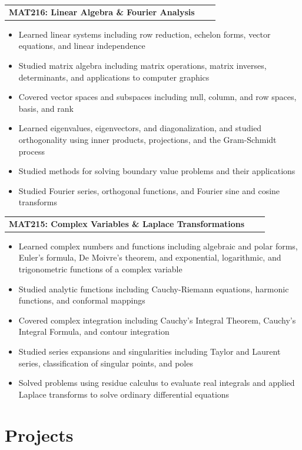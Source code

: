 \documentclass[a4paper,12pt]{article}
\makeatletter
\newenvironment{joblong}[2]
    {
    \begin{tabularx}{\linewidth}{@{}l X r@{}}
    \textbf{#1} & \hfill &  #2 \\[3.75pt]
    \end{tabularx}
    \begin{minipage}[t]{\linewidth}
    \begin{itemize}[nosep,after=\strut, leftmargin=1em, itemsep=3pt,label=--]
    }
    {
    \end{itemize}
    \end{minipage}    
    }
\makeatother
\begin{document}
\begin{joblong}{MAT216: Linear Algebra \& Fourier Analysis}{}
	\item Learned linear systems including row reduction, echelon forms, vector equations, and linear independence
	\item Studied matrix algebra including matrix operations, matrix inverses, determinants, and applications to computer graphics
	\item Covered vector spaces and subspaces including null, column, and row spaces, basis, and rank
	\item Learned eigenvalues, eigenvectors, and diagonalization, and studied orthogonality using inner products, projections, and the Gram-Schmidt process
	\item Studied methods for solving boundary value problems and their applications
	\item Studied Fourier series, orthogonal functions, and Fourier sine and cosine transforms
\end{joblong}

\begin{joblong}{MAT215: Complex Variables \& Laplace Transformations}{}
	\item Learned complex numbers and functions including algebraic and polar forms, Euler's formula, De Moivre's theorem, and exponential, logarithmic, and trigonometric functions of a complex variable
	\item Studied analytic functions including Cauchy-Riemann equations, harmonic functions, and conformal mappings
	\item Covered complex integration including Cauchy's Integral Theorem, Cauchy's Integral Formula, and contour integration
	\item Studied series expansions and singularities including Taylor and Laurent series, classification of singular points, and poles
	\item Solved problems using residue calculus to evaluate real integrals and applied Laplace transforms to solve ordinary differential equations
\end{joblong}

\section{Projects}
\end{document}

